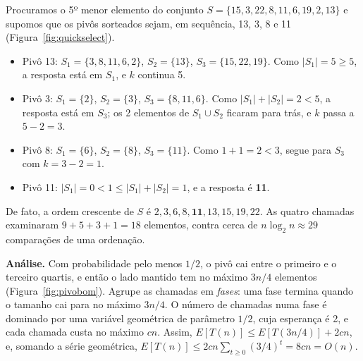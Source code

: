 \begin{exemplo}\label{ex:quickselect}
Procuramos o 5º menor elemento do conjunto $S=\{15,3,22,\allowbreak8,11,6,\allowbreak19,2,13\}$ e supomos que os pivôs sorteados sejam, em sequência, 13, 3, 8 e 11 (Figura~\ref{fig:quickselect}).
\begin{itemize}
  \item Pivô 13: $S_1=\{3,8,11,6,2\}$, $S_2=\{13\}$, $S_3=\{15,22,19\}$. Como $|S_1|=5\ge5$, a resposta está em $S_1$, e $k$ continua 5.
  \item Pivô 3: $S_1=\{2\}$, $S_2=\{3\}$, $S_3=\{8,11,6\}$. Como $|S_1|+|S_2|=2<5$, a resposta está em $S_3$; os 2 elementos de $S_1\cup S_2$ ficaram para trás, e $k$ passa a $5-2=3$.
  \item Pivô 8: $S_1=\{6\}$, $S_2=\{8\}$, $S_3=\{11\}$. Como $1+1=2<3$, segue para $S_3$ com $k=3-2=1$.
  \item Pivô 11: $|S_1|=0<1\le|S_1|+|S_2|=1$, e a resposta é \textbf{11}.
\end{itemize}
De fato, a ordem crescente de $S$ é $2,3,6,8,\mathbf{11},13,15,19,22$. As quatro chamadas examinaram $9+5+3+1=18$ elementos, contra cerca de $n\log_2n\approx29$ comparações de uma ordenação.
\begin{figura}
\end{figura}
\end{exemplo}

\textbf{Análise.} Com probabilidade pelo menos $1/2$, o pivô cai entre o primeiro e o terceiro quartis, e então o lado mantido tem no máximo $3n/4$ elementos (Figura~\ref{fig:pivobom}). Agrupe as chamadas em \emph{fases}: uma fase termina quando o tamanho cai para no máximo $3n/4$. O número de chamadas numa fase é dominado por uma variável geométrica de parâmetro $1/2$, cuja esperança é 2, e cada chamada custa no máximo $cn$. Assim, $E[T(n)]\le E[T(3n/4)]+2cn$, e, somando a série geométrica, $E[T(n)]\le 2cn\sum_{t\ge0}(3/4)^t=8cn=O(n)$.

